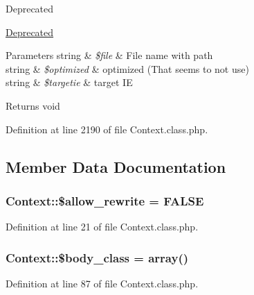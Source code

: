 \begin{DoxyRefDesc}{Deprecated}
\item[\hyperlink{deprecated__deprecated000005}{Deprecated}]
\begin{DoxyParams}[1]{Parameters}
string & {\em \$file} & File name with path \\
\hline
string & {\em \$optimized} & optimized (That seems to not use) \\
\hline
string & {\em \$targetie} & target I\+E \\
\hline
\end{DoxyParams}
\begin{DoxyReturn}{Returns}
void 
\end{DoxyReturn}
\end{DoxyRefDesc}


Definition at line 2190 of file Context.\+class.\+php.



\subsection{Member Data Documentation}
\hypertarget{classContext_a24355a0c151bd3285c45254f773af275}{}
\subsubsection[{\$allow\+\_\+rewrite}]{\setlength{\rightskip}{0pt plus 5cm}Context\+::\$allow\+\_\+rewrite = F\+A\+L\+S\+E}\label{classContext_a24355a0c151bd3285c45254f773af275}


Definition at line 21 of file Context.\+class.\+php.

\hypertarget{classContext_af0bb833a3157d6d2153d7858cb60e435}{}
\subsubsection[{\$body\+\_\+class}]{\setlength{\rightskip}{0pt plus 5cm}Context\+::\$body\+\_\+class = array()}\label{classContext_af0bb833a3157d6d2153d7858cb60e435}


Definition at line 87 of file Context.\+class.\+php.

\hypertarget{classContext_aa2c90f49a1f6389eadea8962d0fbf5b3}{}
